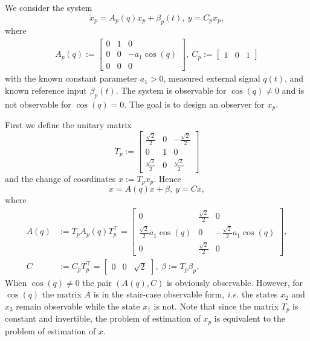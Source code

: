 We consider the system 
\[
	\dot{x}_p = A_p(q)x_p + \beta_p(t), \ y=C_px_p,
\]
where
\[
	\begin{aligned}
		A_p(q) := \begin{bmatrix} 0 & 1 &  0\\ 0 & 0 & -a_1\cos(q)\\ 0 & 0 & 0 \end{bmatrix}, \ C_p := \begin{bmatrix} 1 & 0 & 1 \end{bmatrix}
	\end{aligned}
\]
with the known constant parameter $a_1>0$, measured external signal $q(t)$, and known reference input $\beta_p(t)$. The system is observable for $\cos(q)\ne 0$ and is not observable for $\cos(q)=0$. The goal is to design an observer for $x_p$.

First we define the unitary matrix
\[
	T_p :=  \begin{bmatrix} \frac{\sqrt{2}}{2} & 0 & -\frac{\sqrt{2}}{2}\\ 0 & 1 & 0\\ \frac{\sqrt{2}}{2} & 0 & \frac{\sqrt{2}}{2} 	 \end{bmatrix}
\]
and the change of coordinates $x := T_p x_p$. Hence
\[
	\dot{x} = A(q)x + \beta, \ y=Cx,
\]
where
\[
	\begin{aligned}
		A(q) &:= T_p A_p(q) T_p^\top = 
		\begin{bmatrix} 0 & \frac{\sqrt{2}}{2} & 0\\ \frac{\sqrt{2}}{2}a_{1}\cos(q) & 0 & -\frac{\sqrt{2}}{2}a_{1}\cos(q)\\ 0 & \frac{\sqrt{2}}{2} & 0 \end{bmatrix}, \\
		C &:= C_p T_p^\top = \begin{bmatrix} 0 & 0 & \sqrt{2} \end{bmatrix}, \ \beta:=T_p\beta_p.
	\end{aligned}
\]
When $\cos(q)\ne 0$ the pair $\left(A(q),C\right)$ is obviously observable. However, for $\cos(q)$ the matrix $A$ is in the stair-case observable form, \emph{i.e.} the states $x_{2}$ and $x_{3}$ remain observable while the state $x_{1}$ is not. Note that since the matrix $T_p$ is constant and invertible, the problem of estimation of $x_p$ is equivalent to the problem of estimation of $x$.


